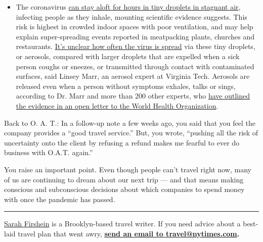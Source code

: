 \begin{itemize}
  \begin{itemize}
  \tightlist
  \item
    The coronavirus
    \href{https://www.nytimes.com/2020/07/04/health/239-experts-with-one-big-claim-the-coronavirus-is-airborne.html?action=click\&pgtype=Article\&state=default\&region=MAIN_CONTENT_3\&context=storylines_faq}{can
    stay aloft for hours in tiny droplets in stagnant air}, infecting
    people as they inhale, mounting scientific evidence suggests. This
    risk is highest in crowded indoor spaces with poor ventilation, and
    may help explain super-spreading events reported in meatpacking
    plants, churches and restaurants.
    \href{https://www.nytimes.com/2020/07/06/health/coronavirus-airborne-aerosols.html?action=click\&pgtype=Article\&state=default\&region=MAIN_CONTENT_3\&context=storylines_faq}{It's
    unclear how often the virus is spread} via these tiny droplets, or
    aerosols, compared with larger droplets that are expelled when a
    sick person coughs or sneezes, or transmitted through contact with
    contaminated surfaces, said Linsey Marr, an aerosol expert at
    Virginia Tech. Aerosols are released even when a person without
    symptoms exhales, talks or sings, according to Dr. Marr and more
    than 200 other experts, who
    \href{https://academic.oup.com/cid/article/doi/10.1093/cid/ciaa939/5867798}{have
    outlined the evidence in an open letter to the World Health
    Organization}.
  \end{itemize}
\end{itemize}

Back to O. A. T.: In a follow-up note a few weeks ago, you said that you
feel the company provides a ``good travel service.'' But, you wrote,
``pushing all the risk of uncertainty onto the client by refusing a
refund makes me fearful to ever do business with O.A.T. again.''

You raise an important point. Even though people can't travel right now,
many of us are continuing to dream about our next trip --- and that
means making conscious and subconscious decisions about which companies
to spend money with once the pandemic has passed.

\begin{center}\rule{0.5\linewidth}{\linethickness}\end{center}

\href{https://twitter.com/sfirshein?lang=en}{Sarah Firshein} is a
Brooklyn-based travel writer. If you need advice about a best-laid
travel plan that went awry,
\textbf{\href{mailto:travel@nytimes.com}{send an email to
travel@nytimes.com}.}

